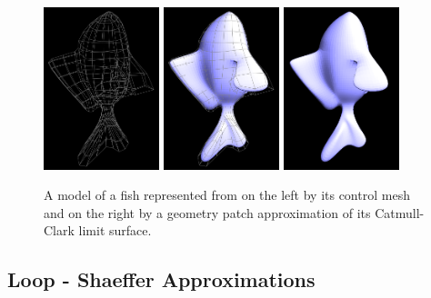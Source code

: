 \documentclass[12pt, letterpaper]{article}
\begin{document}
		\begin{figure}[h]
		\centering
		\includegraphics[width=0.3\textwidth]{fish_cm}
		\includegraphics[width=0.3\textwidth]{fish_cm_and_patch}
		\includegraphics[width=0.3\textwidth]{fish_patch}
		\caption{A model of a fish represented from on the left by its control mesh and on the right by a geometry patch approximation of its Catmull-Clark limit surface.}
		\label{fig:subDDef}
		\end{figure}

	\newpage

	\subsection{Loop - Shaeffer Approximations}
	
\end{document}
